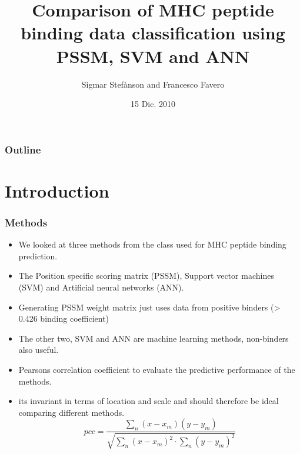 \documentclass[presentation]{beamer}   %
\begin{document}

\author{Sigmar Stef\`{a}nson and Francesco Favero}
\title[PSSM,ANN,SVM]{Comparison of MHC peptide binding data classification using PSSM, SVM and ANN}
\date{15 Dic. 2010}



\begin{frame}
  \maketitle
\end{frame}

\begin{frame}
  \frametitle{Outline}
  \tableofcontents[currentsection]
\end{frame}
\section{Introduction}
\begin{frame}
  \frametitle{Methods}
  \begin{itemize}
    \item<1> We looked at three methods from the class used for MHC peptide binding prediction.
    \item<2>  The Position specific scoring matrix (PSSM), Support vector machines (SVM) and Artificial neural networks (ANN).
    \item<3> Generating PSSM weight matrix just uses data from positive binders (> 0.426 binding coefficient)
    \item<4> The other two, SVM and ANN are machine learning methods, non-binders also useful.
    \item<5> Pearsons correlation coefficient to evaluate the predictive performance of the methods.
    \item<6> its invariant in terms of location and scale and should therefore be ideal comparing different methods.
	\begin{equation}
		pcc = \frac{ \sum_n{(x-x_m)(y-y_m) } }{ \sqrt{ \sum_n{(x-x_m)^2}\cdot\sum_{n}{(y-y_m)^2} } }
	\end{equation}
  \end{itemize}
\end{frame}
\end{document}
